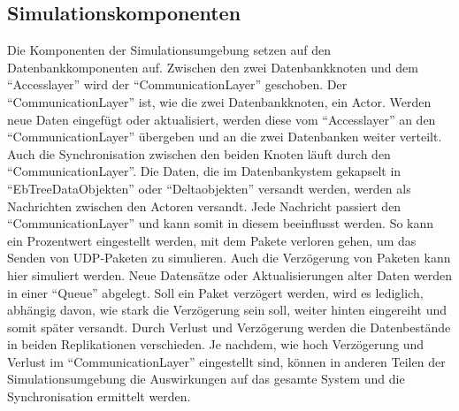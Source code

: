 \documentclass[a4paper,11pt,oneside,%
headsepline,												%
footsepline,												%
bibtotocnumbered									%
]{scrreprt}
\begin{document}
\subsection{Simulationskomponenten}     
Die Komponenten der Simulationsumgebung setzen auf den Datenbankkomponenten auf. Zwischen den zwei Datenbankknoten und dem \enquote{Accesslayer} wird der \enquote{CommunicationLayer} geschoben. Der \enquote{CommunicationLayer} ist, wie die zwei Datenbankknoten, ein Actor. Werden neue Daten eingefügt oder aktualisiert, werden diese vom \enquote{Accesslayer} an den \enquote{CommunicationLayer} übergeben und an die zwei Datenbanken weiter verteilt. Auch die Synchronisation zwischen den beiden Knoten läuft durch den \enquote{CommunicationLayer}. Die Daten, die im Datenbankystem gekapselt in \enquote{EbTreeDataObjekten} oder \enquote{Deltaobjekten} versandt werden, werden als Nachrichten zwischen den Actoren versandt. Jede Nachricht passiert den \enquote{CommunicationLayer} und kann somit in diesem beeinflusst werden. So kann ein Prozentwert eingestellt werden, mit dem Pakete verloren gehen, um das Senden von UDP-Paketen zu simulieren. Auch die Verzögerung von Paketen kann hier simuliert werden. Neue Datensätze oder Aktualisierungen alter Daten werden in einer \enquote{Queue} abgelegt. Soll ein Paket verzögert werden, wird es lediglich, abhängig davon, wie stark die Verzögerung sein soll, weiter hinten eingereiht und somit später versandt. Durch Verlust und Verzögerung werden die Datenbestände in beiden Replikationen verschieden. Je nachdem, wie hoch Verzögerung und Verlust im \enquote{CommunicationLayer} eingestellt sind, können in anderen Teilen der Simulationsumgebung die Auswirkungen auf das gesamte System und die Synchronisation ermittelt werden.\\\\
\end{document}
